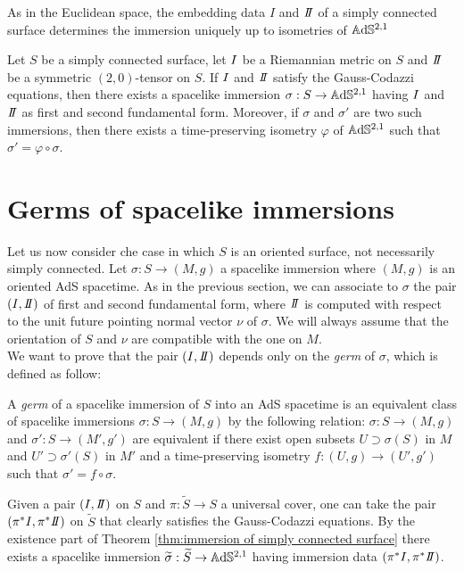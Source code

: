 As in the Euclidean space, the embedding data $I$ and $\II$ of a simply connected surface determines the immersion uniquely up to isometries of $\mathbb{A}\mathrm{d}\mathbb{S}^{2,1}$
\begin{theorem}\label{thm:immersion of simply connected surface}
    Let $S$ be a simply connected surface, let $I$ be a Riemannian metric on $S$ and $\II$ be a symmetric $(2,0)$-tensor on $S$. If $I$ and $\II$ satisfy the Gauss-Codazzi equations, then there exists a spacelike immersion $\sigma:S \to\mathbb{A}\mathrm{d}\mathbb{S}^{2,1}$ having $I$ and $\II$ as first and second fundamental form. Moreover, if $\sigma$ and $\sigma'$ are two such immersions, then there exists a time-preserving isometry $\varphi$ of $\mathbb{A}\mathrm{d}\mathbb{S}^{2,1}$ such that $\sigma' = \varphi \circ \sigma$.
\end{theorem}

\section{Germs of spacelike immersions}
Let us now consider che case in which $S$ is an oriented surface, not necessarily simply connected. Let $\sigma: S \to(M,g)$ a spacelike immersion where $(M,g)$ is an oriented AdS spacetime.
As in the previous section, we can associate to $\sigma$ the pair $(\I,\II)$ of first and second  fundamental form, where $\II$ is  computed with respect to the unit future pointing normal vector $\nu$ of $\sigma$.
We will always assume that the orientation of $S$ and $\nu$ are compatible with the one on $M$.\\
We want to prove that the pair $(\I,\II)$ depends only on the \textit{germ} of $\sigma$, which is defined as follow:
\begin{definition}
    A \textit{germ} of a spacelike immersion of $S$ into an AdS spacetime is an equivalent class of spacelike immersions $\sigma:S \to(M,g)$ by the following relation: $\sigma:S \to(M,g)$ and $\sigma':S \to(M',g')$ are equivalent if there exist open subsets $U \supset \sigma(S)$ in $M$ and $U' \supset \sigma'(S)$ in $M'$ and a time-preserving isometry $f:(U,g)\to(U',g')$ such that $\sigma' = f \circ \sigma$.
\end{definition}
Given a pair $(\I,\II)$ on $S$ and $\pi: \widetilde{S}\to S$ a universal cover, one can take the pair $(\pi^*\I, \pi^*\II)$ on $\widetilde{S}$ that clearly satisfies the Gauss-Codazzi equations. By the existence part of Theorem \ref{thm:immersion of simply connected surface} there exists a spacelike immersion $\widetilde{\sigma}: \widetilde{S} \to\mathbb{A}\mathrm{d}\mathbb{S}^{2,1}$ having immersion data $(\pi^*\I, \pi^*\II)$.
